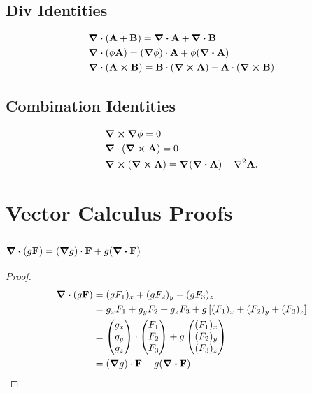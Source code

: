 \documentclass{book}
\begin{document}
\section{Div Identities}
\begin{align}
    & \div{(\vb{A}+\vb{B})} = \div{\vb{A}} + \div{\vb{B}} \\
    & \div{(\phi\vb{A})} = (\grad\phi)\cdot\vb{A} +\phi(\div{\vb{A}}) \\
    & \div{(\vb{A}\cross\vb{B})} = \vb{B}\cdot(\curl{\vb{A}})-\vb{A}\cdot(\curl{\vb{B}})
\end{align}
\section{Combination Identities}
\begin{align}
    & \grad \cross \grad\phi = 0 \\
    & \grad \cdot (\curl{\vb{A}}) = 0 \\
    & \curl{(\curl{\vb{A}})} = \grad(\div{\vb{A}}) - \nabla^2\vb{A}.
\end{align}
\chapter{Vector Calculus Proofs}
\section{$\div{(g\vb{F})} = (\grad g)\cdot \vb{F} + g(\div{\vb{F}})$}
\begin{proof}
    \begin{equation*}
        \begin{split}
            \div{(g\vb{F})} & = (gF_1)_x + (gF_2)_y + (gF_3)_z \\
            & = g_xF_1 + g_y F_2 + g_z F_3 + g\left[(F_1)_x + (F_2)_y + (F_3)_z\right] \\
            & = \begin{pmatrix}
                g_x \\ g_y \\ g_z
            \end{pmatrix} \cdot \begin{pmatrix}
                F_1 \\ F_2 \\ F_3
            \end{pmatrix} + g\begin{pmatrix}
                (F_1)_x \\ (F_2)_y \\ (F_3)_z 
            \end{pmatrix}\\
            & = (\grad g)\cdot \vb{F} + g(\div{\vb{F}})
        \end{split}
    \end{equation*}
\end{proof}
\end{document}

